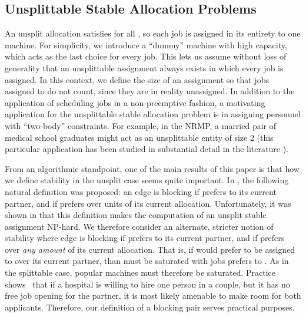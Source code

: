 \documentclass{llncs}
\begin{document}
\iffalse
Ba\"iou and Balinski
prove that each agent can compare any two fractional stable
allocations as a consequence of the rural hospital theorem.  
\fi

\subsection{Unsplittable Stable Allocation Problems}
An unsplit allocation  satisfies  for all
, so each job is assigned in its entirety to one machine.
For simplicity, we introduce a ``dummy'' machine  with high
capacity, which acts as the last choice for every job.  This lets us
assume without loss of generality that an unsplittable assignment
always exists in which every job is assigned.  In this context,
we define the size  of an assignment so that jobs assigned
to  do not count, since they are in reality unassigned.
In addition to the application of scheduling jobs in a non-preemptive
fashion, a motivating application for the unsplittable stable
allocation problem is in assigning personnel with ``two-body''
constraints.  For example, in the NRMP, a married pair of medical
school graduates might act as an unsplittable entity of size 2 (this
particular application has been studied in substantial detail in the
literature
\cite{Biro_emp,couples_survey,journals/jal/Ronn90,Roth84theevolution}).

From an algorithmic standpoint, one of the main results of this paper
is that how we define stability in the unsplit case seems quite
important.  In \cite{DBLP:journals/jco/McDermidM10}, the following
natural definition was proposed: an edge  is blocking if 
prefers  to its current partner, and if  prefers  over 
units of its current allocation.  Unfortunately, it was shown in
\cite{DBLP:journals/jco/McDermidM10} that this definition makes the
computation of an unsplit stable assignment NP-hard.  We therefore
consider an alternate, stricter notion of stability where edge  is
blocking if  prefers  to its current partner, and if  prefers
 over {\em any amount} of its current allocation.  That is, if 
would prefer to be assigned to  over its current partner, than 
must be saturated with jobs  prefers to .  As in the splittable
case, popular machines must therefore be saturated. Practice shows~\cite{Roth96} that if a hospital is willing to hire one person in a couple, but it has no free job opening for the partner, it is most likely amenable to make room for both applicants. Therefore, our definition of a blocking pair serves practical purposes.
\end{document}
